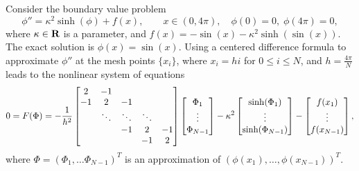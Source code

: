 \documentclass{homework}
\begin{document}
	\question Consider the boundary value problem
	\begin{equation}
		\label{eq:p7:bvp}
		\phi'' = \kappa^2\sinh(\phi) + f(x), \qquad x\in (0,4\pi), \quad \phi(0) = 0, \; \phi(4\pi) = 0,
	\end{equation}
	where $\kappa\in\textbf{R}$ is a parameter, and $f(x) = -\sin(x) - \kappa^2\sinh(\sin(x))$. The exact solution is $\phi(x) = \sin(x)$. Using a centered difference formula to approximate $\phi''$ at the mesh points $\{x_i\}$, where $x_i = hi$ for $0 \le i \le N$, and $h = \frac{4\pi}{N}$ leads to the nonlinear system of equations
	\begin{equation}
		\label{eq:p7:discretized}
		0 = F(\Phi) = -\frac{1}{h^2}\left[\begin{matrix}
			2 & - 1 \\
			-1 & 2 & -1 \\
			& \ddots & \ddots & \ddots \\
			& & -1 & 2 & -1 \\
			& & & -1 & 2
		\end{matrix}\right]\left[\begin{matrix}\Phi_1 \\ \vdots \\ \Phi_{N-1}\end{matrix}\right] - \kappa^2 \left[\begin{matrix}\sinh(\Phi_1) \\ \vdots \\ \sinh(\Phi_{N-1})\end{matrix}\right] - \left[\begin{matrix}f(x_1) \\ \vdots \\ f(x_{N-1})\end{matrix}\right],
	\end{equation}
	where $\Phi = (\Phi_1, \dots \Phi_{N-1})^T$ is an approximation of $(\phi(x_1), \dots, \phi(x_{N-1}))^T$.
\end{document}
